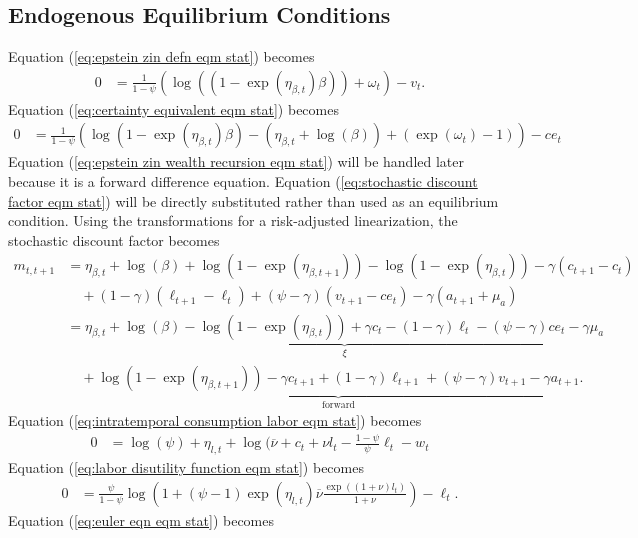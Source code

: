 \documentclass[12 pt, oneside]{article}
\theoremstyle{definition}
\theoremstyle{definition}
\theoremstyle{definition}
\begin{document}
\subsection{Endogenous Equilibrium Conditions}
Equation (\ref{eq:epstein zin defn eqm stat}) becomes
\begin{align*}
  0 & = \frac{1}{1 - \psi}(\log((1 - \exp(\eta_{\beta, t})\beta)) + \omega_t) - v_t.
\end{align*}
Equation (\ref{eq:certainty equivalent eqm stat}) becomes
\begin{align*}
  0 & = \frac{1}{1 - \psi}(\log(1 - \exp(\eta_{\beta, t})\beta) - (\eta_{\beta, t} + \log(\beta)) + (\exp(\omega_t) - 1)) - ce_t
\end{align*}
Equation (\ref{eq:epstein zin wealth recursion eqm stat}) will be handled later because it is a forward difference equation. Equation (\ref{eq:stochastic discount factor eqm stat}) will be directly substituted rather than used as an equilibrium condition. Using the transformations for a risk-adjusted linearization, the stochastic discount factor becomes
\begin{align*}
  m_{t, t + 1} & = \eta_{\beta, t} + \log(\beta)  + \log(1 - \exp(\eta_{\beta, t + 1})) - \log(1 - \exp(\eta_{\beta, t})) - \gamma (c_{t + 1} - c_t) \\
               &\quad + (1 - \gamma)(\ell_{t + 1} - \ell_t) + (\psi - \gamma)(v_{t + 1} - ce_t) - \gamma(a_{t + 1} + \mu_a)\\
               & = \underbrace{\eta_{\beta, t} + \log(\beta) - \log(1 - \exp(\eta_{\beta, t})) + \gamma c_t - (1 - \gamma) \ell_t - (\psi - \gamma) ce_t - \gamma \mu_a}_{\xi} \\
               &\quad + \underbrace{\log(1 - \exp(\eta_{\beta, t + 1})) - \gamma c_{t + 1} + (1 - \gamma) \ell_{t + 1} + (\psi - \gamma) v_{t + 1} - \gamma a_{t + 1}}_{\text{forward}}.
\end{align*}
Equation (\ref{eq:intratemporal consumption labor eqm stat}) becomes
\begin{align*}
  0 & = \log(\psi) + \eta_{l, t} + \log(\overline{\nu} + c_t + \nu l_t - \frac{1 - \psi}{\psi}\ell_t - w_t
\end{align*}
Equation (\ref{eq:labor disutility function eqm stat}) becomes
\begin{align*}
  0 & = \frac{\psi}{1 - \psi}\log\left(1 + (\psi - 1)\exp(\eta_{l, t})\overline{\nu}\frac{\exp((1 + \nu)l_t)}{1 + \nu}\right) - \ell_t.
\end{align*}
Equation (\ref{eq:euler eqn eqm stat}) becomes
\end{document}
